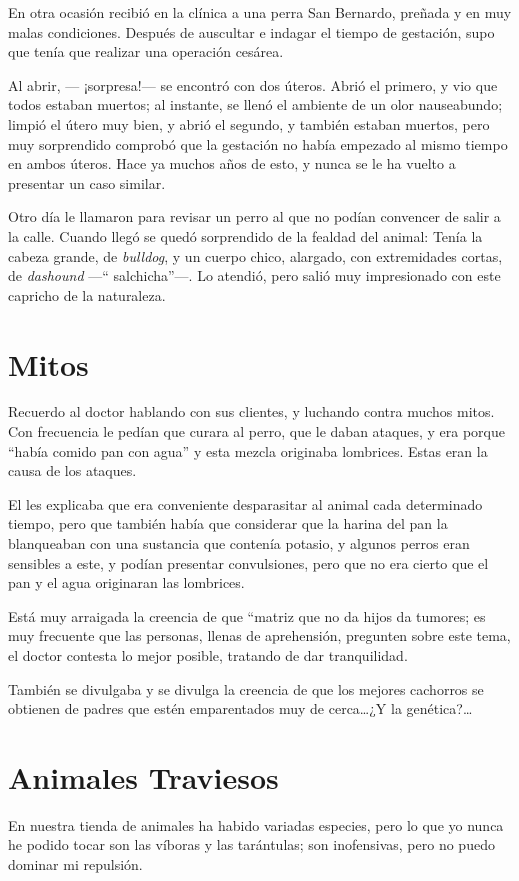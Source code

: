 \documentclass[letterpaper, 12pt]{book}
\begin{document}
En otra ocasión recibió en la clínica a una perra San Bernardo, preñada y en muy malas condiciones. Después de auscultar e indagar el tiempo de gestación, supo que tenía que realizar una operación cesárea.

Al abrir, --- ¡sorpresa!--- se encontró con dos úteros. Abrió el primero, y vio que todos estaban muertos; al instante, se llenó el ambiente de un olor nauseabundo; limpió el útero muy bien, y abrió el segundo, y también estaban muertos, pero muy sorprendido comprobó que la gestación no había empezado al mismo tiempo en ambos úteros. Hace ya muchos años de esto, y nunca se le ha vuelto a presentar un caso similar.

Otro día le llamaron para revisar un perro al que no podían convencer de salir a la calle. Cuando llegó se quedó sorprendido de la fealdad del animal: Tenía la cabeza grande, de \textit{bulldog}, y un cuerpo chico, alargado, con extremidades cortas, de \textit{dashound} ---`` salchicha''---. Lo atendió, pero salió muy impresionado con este capricho de la naturaleza.

\chapter{Mitos}
Recuerdo al doctor hablando con sus clientes, y luchando contra muchos mitos. Con frecuencia le pedían que curara al perro, que le daban ataques, y era porque ``había comido pan con agua'' y esta mezcla originaba lombrices. Estas eran la causa de los ataques.

El les explicaba que era conveniente desparasitar al animal cada determinado tiempo, pero que también había que considerar que la harina del pan la blanqueaban con una sustancia que contenía potasio, y algunos perros eran sensibles a este, y podían presentar convulsiones, pero que no era cierto que el pan y el agua originaran las lombrices.

Está muy arraigada la creencia de que ``matriz que no da hijos da tumores; es muy frecuente que las personas, llenas de aprehensión, pregunten sobre este tema, el doctor contesta lo mejor posible, tratando de dar tranquilidad. 

También se divulgaba y se divulga la creencia de que los mejores cachorros se obtienen de padres que estén emparentados muy de cerca\ldots¿Y la genética?\ldots

\chapter{Animales Traviesos}
En nuestra tienda de animales ha habido variadas especies, pero lo que yo nunca he podido tocar son las víboras y las tarántulas; son inofensivas, pero no puedo dominar mi repulsión.
\end{document}
